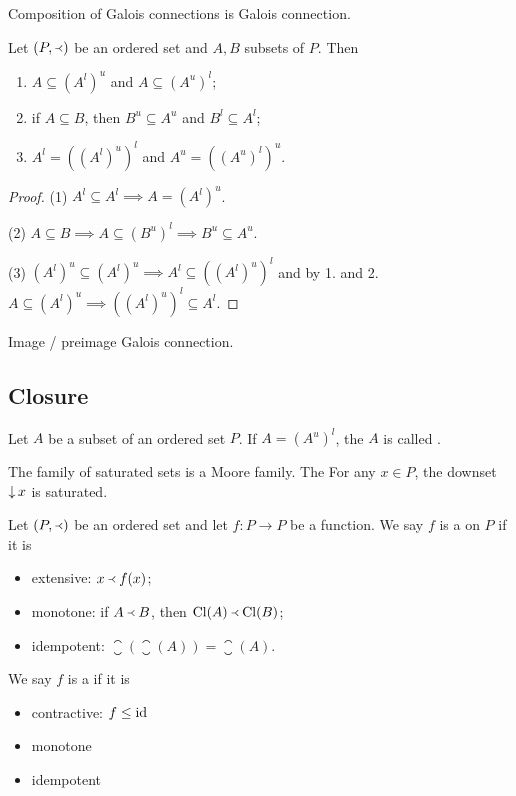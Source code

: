 \begin{lemma}
Composition of Galois connections is Galois connection.
\end{lemma}

\begin{corollary}
Let $(P,\Yleft)$ be an ordered set and $A,B$ subsets of $P$. Then
\begin{enumerate}
\item $A\subseteq (A^l)^u$ and $A\subseteq (A^u)^l$;
\item if $A\subseteq B$, then $B^u\subseteq A^u$ and $B^l \subseteq A^l$;
\item $A^l = ((A^l)^u)^l$ and $A^u = ((A^u)^l)^u$.
\end{enumerate}
\end{corollary}
\begin{proof}
(1) $A^l \subseteq A^l \implies A = (A^l)^u$.

(2) $A\subseteq B \implies A \subseteq (B^u)^l \implies B^u\subseteq A^u$.

(3) $(A^l)^u \subseteq (A^l)^u \implies A^l \subseteq ((A^l)^u)^l$ and by 1. and 2. $A\subseteq (A^l)^u \implies ((A^l)^u)^l \subseteq A^l$.
\end{proof}

\begin{proposition}
Image / preimage Galois connection.
\end{proposition}


\subsection{Closure}

\begin{definition}
Let $A$ be a subset of an ordered set $P$. If $A = (A^u)^l$, the $A$ is called .
\end{definition}

The family of saturated sets is a Moore family. The For any $x\in P$, the downset $\mathop{\downarrow} x$ is saturated.

\begin{definition}
Let $\left( P,\Yleft \right)$ be an ordered set and let $f:P \to P$ be a function. We say $f$ is a  on $P$ if it is
\begin{itemize}
\item extensive: $x \Yleft f(x)$;
\item monotone: if $A \Yleft B$, then $\operatorname{Cl}(A) \Yleft \operatorname{Cl}(B)$;
\item idempotent: $\closure(\closure(A)) = \closure(A)$.
\end{itemize}
We say $f$ is a  if it is
\begin{itemize}
\item contractive: $f \leq \operatorname{id}$
\item monotone
\item idempotent
\end{itemize}
\end{definition}


